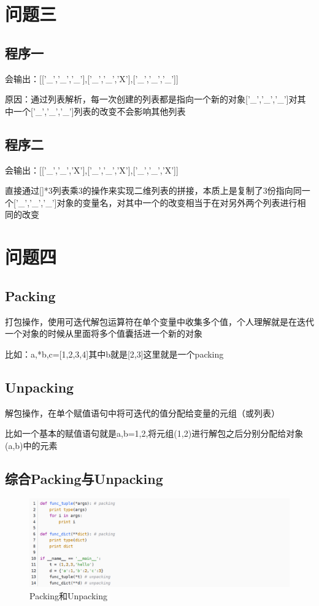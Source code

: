 \documentclass[10pt]{article}
\begin{document}
\section{问题三}	
	\subsection{程序一}
	会输出：[['\_','\_','\_'],['\_','\_','X'],['\_','\_','\_']]\par
	原因：通过列表解析，每一次创建的列表都是指向一个新的对象['\_','\_','\_']对其中一个['\_','\_','\_']列表的改变不会影响其他列表
	\subsection{程序二}
	会输出：[['\_','\_','X'],['\_','\_','X'],['\_','\_','X']]\par
	直接通过[]*3列表乘3的操作来实现二维列表的拼接，本质上是复制了3份指向同一个['\_','\_','\_']对象的变量名，对其中一个的改变相当于在对另外两个列表进行相同的改变
\section{问题四}
		\subsection{Packing}
		打包操作，使用可迭代解包运算符在单个变量中收集多个值，个人理解就是在迭代一个对象的时候从里面将多个值囊括进一个新的对象\par
		比如：a,*b,c=[1,2,3,4]\quad 其中b就是[2,3]这里就是一个packing
		\subsection{Unpacking}
		解包操作，在单个赋值语句中将可迭代的值分配给变量的元组（或列表）\par
		比如一个基本的赋值语句就是a,b=1,2,将元组(1,2)进行解包之后分别分配给对象(a,b)中的元素
		\subsection{综合Packing与Unpacking}
			\begin{figure}[H]
			\centering
			\includegraphics[scale=0.6]{Packing和Unpacking}
			\caption{Packing和Unpacking}
			\end{figure}
\end{document}
